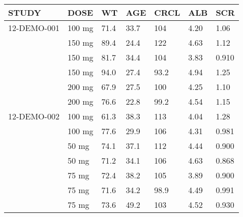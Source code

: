 {\def\arraystretch{1.4}\tabcolsep=5pt
\begin{threeparttable}
\begin{tabular}[h]{lllllll}
\hline
STUDY & DOSE & WT & AGE & CRCL & ALB & SCR \\
\hline
12-DEMO-001 & 100 mg & 71.4 & 33.7 & 104 & 4.20 & 1.06 \\
 & 150 mg & 89.4 & 24.4 & 122 & 4.63 & 1.12 \\
 & 150 mg & 81.7 & 34.4 & 104 & 3.83 & 0.910 \\
 & 150 mg & 94.0 & 27.4 & 93.2 & 4.94 & 1.25 \\
 & 200 mg & 67.9 & 27.5 & 100 & 4.25 & 1.10 \\
 & 200 mg & 76.6 & 22.8 & 99.2 & 4.54 & 1.15 \\ \hline
12-DEMO-002 & 100 mg & 61.3 & 38.3 & 113 & 4.04 & 1.28 \\
 & 100 mg & 77.6 & 29.9 & 106 & 4.31 & 0.981 \\
 & 50 mg & 74.1 & 37.1 & 112 & 4.44 & 0.900 \\
 & 50 mg & 71.2 & 34.1 & 106 & 4.63 & 0.868 \\
 & 75 mg & 72.4 & 38.2 & 105 & 3.89 & 0.900 \\
 & 75 mg & 71.6 & 34.2 & 98.9 & 4.49 & 0.991 \\
 & 75 mg & 73.6 & 49.2 & 103 & 4.52 & 0.930 \\
\hline
\end{tabular}
\end{threeparttable}
}

